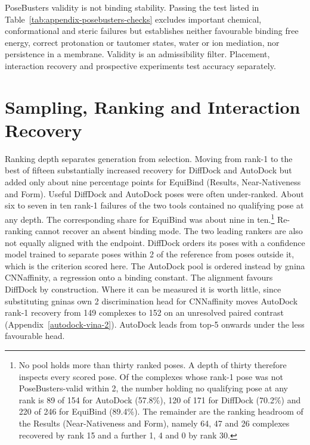PoseBusters validity is not binding stability. Passing the test listed in Table~\ref{tab:appendix-posebusters-checks} excludes important chemical, conformational and steric failures but establishes neither favourable binding free energy, correct protonation or tautomer states, water or ion mediation, nor persistence in a membrane. Validity is an admissibility filter. Placement, interaction recovery and prospective experiments test accuracy separately.

\hypertarget{sampling-ranking-and-interaction-recovery}{%
\section{Sampling, Ranking and Interaction Recovery}\label{sampling-ranking-and-interaction-recovery}}

Ranking depth separates generation from selection. Moving from rank-1 to the best of fifteen substantially increased recovery for DiffDock and AutoDock but added only about nine percentage points for EquiBind (Results, Near-Nativeness and Form). Useful DiffDock and AutoDock poses were often under-ranked. About six to seven in ten rank-1 failures of the two tools contained no qualifying pose at any depth. The corresponding share for EquiBind was about nine in ten.\footnote{No pool holds more than thirty ranked poses. A depth of thirty therefore inspects every scored pose. Of the complexes whose rank-1 pose was not PoseBusters-valid within 2\angstrom{}, the number holding no qualifying pose at any rank is 89 of 154 for AutoDock (57.8\%), 120 of 171 for DiffDock (70.2\%) and 220 of 246 for EquiBind (89.4\%). The remainder are the ranking headroom of the Results (Near-Nativeness and Form), namely 64, 47 and 26 complexes recovered by rank 15 and a further 1, 4 and 0 by rank 30.} Re-ranking cannot recover an absent binding mode. The two leading rankers are also not equally aligned with the endpoint. DiffDock orders its poses with a confidence model trained to separate poses within 2\angstrom{} of the reference from poses outside it, which is the criterion scored here. The AutoDock pool is ordered instead by gnina CNNaffinity, a regression onto a binding constant. The alignment favours DiffDock by construction. Where it can be measured it is worth little, since substituting gnina\textquotesingle s own 2\angstrom{} discrimination head for CNNaffinity moves AutoDock rank-1 recovery from 149 complexes to 152 on an unresolved paired contrast (Appendix~\ref{autodock-vina-2}). AutoDock leads from top-5 onwards under the less favourable head.

